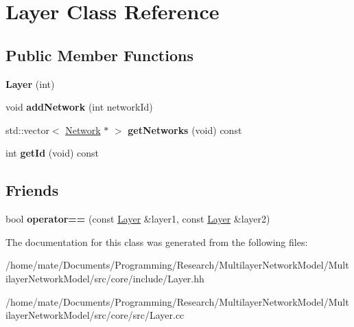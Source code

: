 \hypertarget{classLayer}{}\section{Layer Class Reference}
\label{classLayer}
\subsection*{Public Member Functions}
\begin{DoxyCompactItemize}
\item 
{\bfseries Layer} (int)\hypertarget{classLayer_a3f0552558b7008ebe37b74d55181d2a8}{}\label{classLayer_a3f0552558b7008ebe37b74d55181d2a8}

\item 
void {\bfseries add\+Network} (int network\+Id)\hypertarget{classLayer_ae76589e097e0fc8d3fc0d16c83670a5c}{}\label{classLayer_ae76589e097e0fc8d3fc0d16c83670a5c}

\item 
std\+::vector$<$ \hyperlink{classNetwork}{Network} $\ast$ $>$ {\bfseries get\+Networks} (void) const \hypertarget{classLayer_a7c8fe4f0a91522c0ffbb4b6ed3d507f1}{}\label{classLayer_a7c8fe4f0a91522c0ffbb4b6ed3d507f1}

\item 
int {\bfseries get\+Id} (void) const \hypertarget{classLayer_a00123131915f8bef4bf58bda3229e80c}{}\label{classLayer_a00123131915f8bef4bf58bda3229e80c}

\end{DoxyCompactItemize}
\subsection*{Friends}
\begin{DoxyCompactItemize}
\item 
bool {\bfseries operator==} (const \hyperlink{classLayer}{Layer} \&layer1, const \hyperlink{classLayer}{Layer} \&layer2)\hypertarget{classLayer_aca6ebc1f2e29896977fd9434db21761b}{}\label{classLayer_aca6ebc1f2e29896977fd9434db21761b}

\end{DoxyCompactItemize}


The documentation for this class was generated from the following files\+:\begin{DoxyCompactItemize}
\item 
/home/mate/\+Documents/\+Programming/\+Research/\+Multilayer\+Network\+Model/\+Multilayer\+Network\+Model/src/core/include/Layer.\+hh\item 
/home/mate/\+Documents/\+Programming/\+Research/\+Multilayer\+Network\+Model/\+Multilayer\+Network\+Model/src/core/src/Layer.\+cc\end{DoxyCompactItemize}

